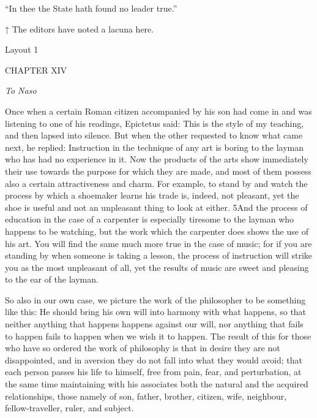 ``In thee the State hath found no leader true.''



↑ The editors have noted a lacuna here.


Layout 1

CHAPTER XIV

\emph{To Naso}

Once when a certain Roman citizen accompanied by his son had come in and was listening to one of his readings, Epictetus said: This is the style of my teaching, and then lapsed into silence. But when the other requested to know what came next, he replied: Instruction in the technique of any art is boring to the layman who has had no experience in it. Now the products of the arts show immediately their use towards the purpose for which they are made, and most of them possess also a certain attractiveness and charm. For example, to stand by and watch the process by which a shoemaker learns his trade is, indeed, not pleasant, yet the shoe is useful and not an unpleasant thing to look at either. 5And the process of education in the case of a carpenter is especially tiresome to the layman who happens to be watching, but the work which the carpenter does shows the use of his art. You will find the same much more true in the case of music; for if you are standing by when someone is taking a lesson, the process of instruction will strike you as the most unpleasant of all, yet the results of music are sweet and pleasing to the ear of the layman.

So also in our own case, we picture the work of the philosopher to be something like this: He should bring his own will into harmony with what happens, so that neither anything that happens happens against our will, nor anything that fails to happen fails to happen when we wish it to happen. The result of this for those who have so ordered the work of philosophy is that in desire they are not disappointed, and in aversion they do not fall into what they would avoid; that each person passes his life to himself, free from pain, fear, and perturbation, at the same time maintaining with his associates both the natural and the acquired relationships, those namely of son, father, brother, citizen, wife, neighbour, fellow-traveller, ruler, and subject.

